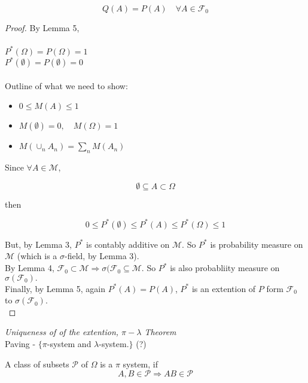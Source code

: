 \documentclass[11pt,fleqn]{book} %
\begin{document}
	$$Q(A) =  P(A) \quad \forall A \in \mathscr{F}_0$$

\begin{proof}
	By Lemma 5, \\
\\
	$P^*(\Omega) = P(\Omega) = 1$\\
	$P^*(\emptyset) = P(\emptyset) = 0$\\
	\\

	Outline of what we need to show:\\

	\begin{itemize}
		\item $ 0 \leq M(A) \leq 1$
		\item $M(\emptyset) = 0, \quad M(\Omega)=1$
		\item $M(\cup_n A_n) = \sum_n M(A_n)$
	\end{itemize}

	\vspace{5mm}

	Since $\forall A \in \mathscr{M}$, 

	$$\emptyset \subseteq A \subset \Omega $$

	then 

	$$ 0 \leq P^*(\emptyset) \leq P^*(A) \leq P^*(\Omega) \leq 1$$

	But, by Lemma 3, $P^*$ is contably additive on $\mathscr{M}$. So $P^*$ is probability measure on $\mathscr{M}$ (which is a $\sigma$-field, by Lemma 3).\\

	By Lemma 4, $\mathscr{F}_0 \subset \mathscr{M} \Rightarrow \sigma(\mathscr{F}_0 \subseteq \mathscr{M}$. So $P^*$ is also probabliity measure on $\sigma(\mathscr{F}_0).$\\

	Finally, by Lemma 5, again $P^*(A) = P(A)$, $P^*$ is an extention of $P$ form $\mathscr{F}_0$  to $\sigma(\mathscr{F}_0)$. \\
\end{proof}

\textit{Uniqueness of of the extention, $\pi-\lambda$ Theorem}\\

	Paving - $\{ \pi$-system and $\lambda$-system.$\}$ (?)\\

\begin{definition}[$\pi$-System]
	A class of subsets $\mathscr{P}$ of $\Omega$ is a $\pi$ system, if $$A, B \in \mathscr{P} \Rightarrow AB \in \mathscr{P}$$ 
\end{definition}
	
\end{document}
